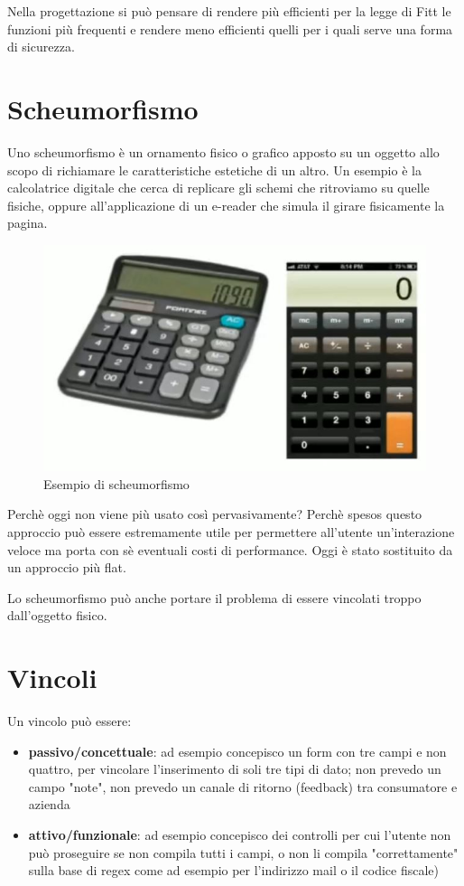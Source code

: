 \documentclass[11pt,a4paper]{book}
\begin{document}
Nella progettazione si può pensare di rendere più efficienti per la legge di Fitt le funzioni più frequenti e rendere meno efficienti quelli per i quali serve una forma di sicurezza.

\section{Scheumorfismo}
Uno scheumorfismo è un ornamento fisico o grafico apposto su un oggetto allo scopo di richiamare le caratteristiche estetiche di un altro. Un esempio è la calcolatrice digitale che cerca di replicare gli schemi che ritroviamo su quelle fisiche, oppure all'applicazione di un e-reader che simula il girare fisicamente la pagina.

\begin{figure}[h!]
	\begin{center}
		\includegraphics[scale=0.6]{img/005.jpg}
		\caption{Esempio di scheumorfismo}
		\label{fig: 005}
	\end{center}	
\end{figure}

Perchè oggi non viene più usato così pervasivamente? Perchè spesos questo approccio può essere estremamente utile per permettere all'utente un'interazione veloce ma porta con sè eventuali costi di performance. Oggi è stato sostituito da un approccio più flat. 

Lo scheumorfismo può anche portare il problema di essere vincolati troppo dall'oggetto fisico.

\section{Vincoli}
Un vincolo può essere:
\begin{itemize}
	\item \textbf{passivo/concettuale}: ad esempio concepisco un form con tre campi e non quattro, per vincolare l'inserimento di soli tre tipi di dato; non prevedo un campo "note", non prevedo un canale di ritorno (feedback) tra consumatore e azienda
	\item \textbf{attivo/funzionale}: ad esempio concepisco dei controlli per cui l'utente non può proseguire se non compila tutti i campi, o non li compila "correttamente" sulla base di regex come ad esempio per l'indirizzo mail o il codice fiscale)
\end{itemize}
\end{document}
